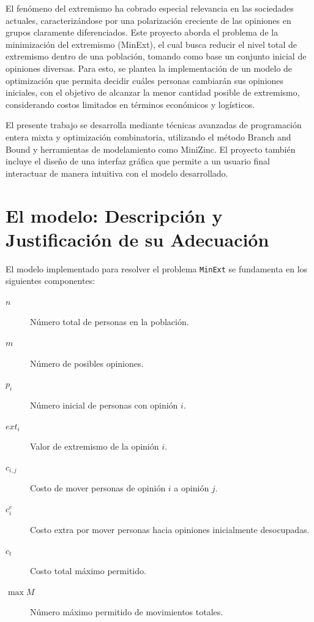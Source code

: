 \documentclass[11pt,letter]{article}
\begin{document}
El fenómeno del extremismo ha cobrado especial relevancia en las sociedades actuales, caracterizándose por una polarización creciente de las opiniones en grupos claramente diferenciados. Este proyecto aborda el problema de la minimización del extremismo (MinExt), el cual busca reducir el nivel total de extremismo dentro de una población, tomando como base un conjunto inicial de opiniones diversas. Para esto, se plantea la implementación de un modelo de optimización que permita decidir cuáles personas cambiarán sus opiniones iniciales, con el objetivo de alcanzar la menor cantidad posible de extremismo, considerando costos limitados en términos económicos y logísticos.

El presente trabajo se desarrolla mediante técnicas avanzadas de programación entera mixta y optimización combinatoria, utilizando el método Branch and Bound y herramientas de modelamiento como MiniZinc. El proyecto también incluye el diseño de una interfaz gráfica que permite a un usuario final interactuar de manera intuitiva con el modelo desarrollado.

\newpage

\section{El modelo: Descripción y Justificación de su Adecuación}

El modelo implementado para resolver el problema \texttt{MinExt} se fundamenta en los siguientes componentes:

\begin{description}
  \item[$n$] Número total de personas en la población.
  \item[$m$] Número de posibles opiniones.
  \item[$p_i$] Número inicial de personas con opinión $i$.
  \item[$\mathit{ext}_i$] Valor de extremismo de la opinión $i$.
  \item[$c_{i,j}$] Costo de mover personas de opinión $i$ a opinión $j$.
  \item[$c^e_i$] Costo extra por mover personas hacia opiniones inicialmente desocupadas.
  \item[$c_t$] Costo total máximo permitido.
  \item[$\max M$] Número máximo permitido de movimientos totales.
\end{description}
\end{document}
